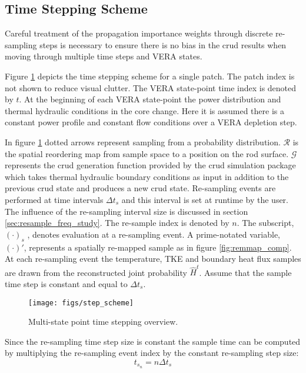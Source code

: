 \subsection{Time Stepping Scheme}

Careful treatment of the propagation importance weights through discrete re-sampling steps is necessary to ensure there is no bias in the crud results when moving through multiple time steps and VERA states.

Figure \ref{fig:stepscheme} depicts the time stepping scheme for a single patch. The patch index is not shown to reduce visual clutter. The VERA state-point time index is denoted by $t$.  At the beginning of each VERA state-point the power distribution and thermal hydraulic conditions in the core change.  Here it is assumed there is a constant power profile and constant flow conditions over a VERA depletion step. 

In figure \ref{fig:stepscheme} dotted arrows represent sampling from a probability distribution.  $\mathcal R$ is the spatial reordering map from sample space to a position on the rod surface. $\mathcal G$ represents the crud generation function provided by the crud simulation package which takes thermal hydraulic boundary conditions as input in addition to the previous crud state and produces a new crud state.  Re-sampling events are performed at time intervals $\Delta t_s$ and this interval is set at runtime by the user.  The influence of the re-sampling interval size is discussed in section \ref{sec:resample_freq_study}.  The re-sample index is denoted by $n$.  The subscript, $(\cdot)_s$ , denotes evaluation at a re-sampling event.  A prime-notated variable,  $(\cdot)'$, represents a spatially re-mapped sample as in figure \ref{fig:remmap_comp}.  At each re-sampling event the temperature, TKE and boundary heat flux samples are drawn from the reconstructed joint probability $\hat H^t$.  Assume that the sample time step is constant and equal to $\Delta t_s$.

\begin{figure}[H]
    \centering
    \texttt{[image: figs/step\_scheme]}
    \caption{Multi-state point time stepping overview.}
    \label{fig:stepscheme}
\end{figure}

Since the re-sampling time step size is constant the sample time can be computed by multiplying the re-sampling event index by the constant re-sampling step size:
\begin{equation}
t_{s_n} = n\Delta t_s
\end{equation}

